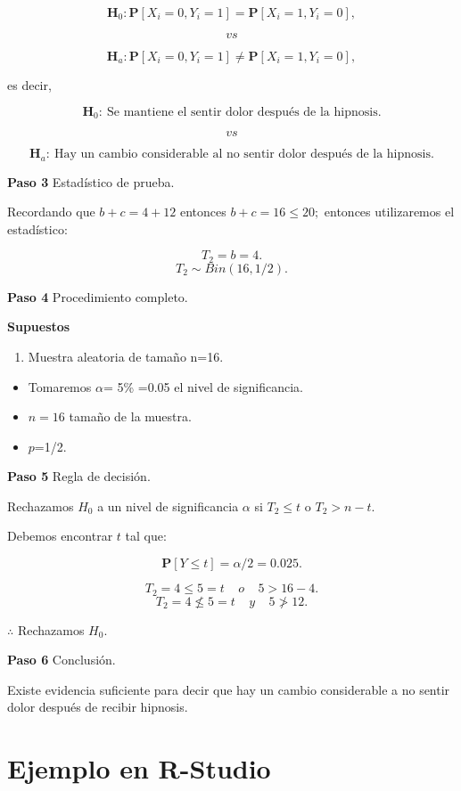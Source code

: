 \documentclass[
  a4paper,
  oneside,
  openany]{book}
\providecommand{\tightlist}{%
  \setlength{\itemsep}{0pt}\setlength{\parskip}{0pt}}
\begin{document}
\[\textbf{H}_0: \mathbf{P}[X_{i}=0,Y_{i}=1]= \mathbf{P}[X_{i}=1,Y_{i}=0],\]

\[vs\]

\[\textbf{H}_a: \mathbf{P}[X_{i}=0,Y_{i}=1]\neq \mathbf{P}[X_{i}=1,Y_{i}=0],\]

es decir,

\[\textbf{H}_0: \ \mbox{Se mantiene el sentir dolor después de la hipnosis.}\]

\[vs\]

\[\textbf{H}_a:\ \mbox{Hay un cambio considerable al no sentir dolor después de la hipnosis.}\]

\textbf{Paso 3} Estadístico de prueba.

Recordando que \(b+c=4+12\) entonces \(b+c=16\leq20;\) entonces utilizaremos el estadístico:

\[T_{2}=b=4.\]
\[T_{2}\sim Bin(16,1/2).\]

\textbf{Paso 4} Procedimiento completo.

\textbf{Supuestos}

\begin{enumerate}
\def\labelenumi{\arabic{enumi}.}
\tightlist
\item
  Muestra aleatoria de tamaño n=16.
\end{enumerate}

\begin{itemize}
\item
  Tomaremos \(\alpha\)= 5\% =0.05 el nivel de significancia.
\item
  \(n=16\) tamaño de la muestra.
\item
  \(p\)=1/2.
\end{itemize}

\textbf{Paso 5} Regla de decisión.

Rechazamos \(H_0\) a un nivel de significancia \(\alpha\) si \(T_{2} \leq t\) o \(T_{2}>n-t.\)

Debemos encontrar \(t\) tal que:

\[\mathbf{P}[Y \leq t]=\alpha/2=0.025.\]

\[T_{2}=4 \leq 5=t  \ \ \ \ \   o  \ \ \ \ \      5>16-4.  \]
\[T_{2}=4 \nleq 5=t   \ \ \ \ \   y   \ \ \ \ \      5\ngtr12.\]

\(\therefore\) Rechazamos \(H_0.\)

\textbf{Paso 6} Conclusión.

Existe evidencia suficiente para decir que hay un cambio considerable a no sentir dolor después de recibir hipnosis.

\hypertarget{ejemplo-en-r-studio-3}{%
\section{Ejemplo en R-Studio}\label{ejemplo-en-r-studio-3}}
\end{document}
